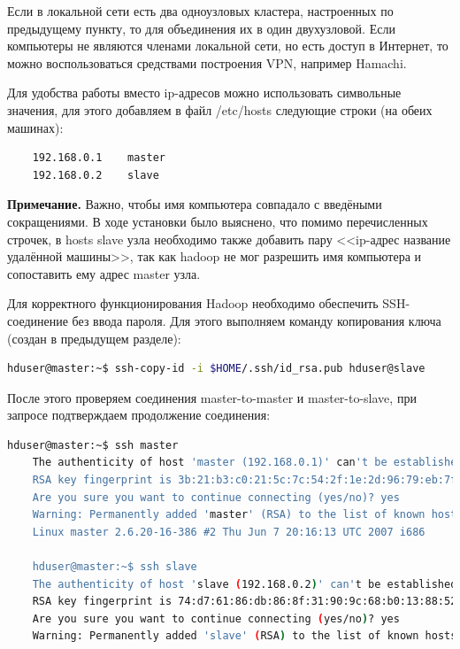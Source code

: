 \documentclass[12pt,a4paper]{extarticle} %
\begin{document}
    Если в локальной сети есть два одноузловых кластера, настроенных по предыдущему пункту, то для объединения их в один двухузловой. Если компьютеры не являются членами локальной сети, но есть доступ в Интернет, то можно воспользоваться средствами построения VPN, например Hamachi.
    
    Для удобства работы вместо ip-адресов можно использовать символьные значения, для этого добавляем в файл /etc/hosts следующие строки (на обеих машинах):
\begin{lstlisting}
    192.168.0.1    master
    192.168.0.2    slave
\end{lstlisting}
	\textbf{Примечание.} Важно, чтобы имя компьютера совпадало с введёными сокращениями. В ходе установки было выяснено, что помимо перечисленных строчек, в hosts slave узла необходимо также добавить пару <<ip-адрес название удалённой машины>>, так как hadoop не мог разрешить имя компьютера и сопоставить ему адрес master узла.

 Для корректного функционирования Hadoop необходимо обеспечить SSH-соединение без ввода пароля. Для этого выполняем команду копирования ключа (создан в предыдущем разделе):
\begin{lstlisting}[language=sh]
    hduser@master:~$ ssh-copy-id -i $HOME/.ssh/id_rsa.pub hduser@slave
\end{lstlisting}

\noindent После этого проверяем соединения master-to-master и master-to-slave, при запросе подтверждаем продолжение соединения: 
\begin{lstlisting}[language=sh]
    hduser@master:~$ ssh master
    The authenticity of host 'master (192.168.0.1)' can't be established.
    RSA key fingerprint is 3b:21:b3:c0:21:5c:7c:54:2f:1e:2d:96:79:eb:7f:95.
    Are you sure you want to continue connecting (yes/no)? yes
    Warning: Permanently added 'master' (RSA) to the list of known hosts.
    Linux master 2.6.20-16-386 #2 Thu Jun 7 20:16:13 UTC 2007 i686
    
    hduser@master:~$ ssh slave
    The authenticity of host 'slave (192.168.0.2)' can't be established.
    RSA key fingerprint is 74:d7:61:86:db:86:8f:31:90:9c:68:b0:13:88:52:72.
    Are you sure you want to continue connecting (yes/no)? yes
    Warning: Permanently added 'slave' (RSA) to the list of known hosts.
\end{lstlisting}
\end{document}
